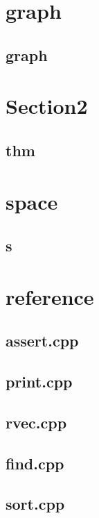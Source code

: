 \section{graph}
    \subsection{graph}
        


\section{Section2}
    \subsection{thm}
        

\section{space}
    \subsection{s}
        


\section{reference}
    \subsection{assert.cpp}
        
    \subsection{print.cpp}
        
    \subsection{rvec.cpp}
        
    \subsection{find.cpp}
        
    \subsection{sort.cpp}
        
